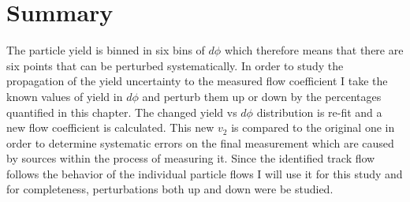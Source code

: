 \section{Summary}
The particle yield is binned in six bins of $d\phi$ which therefore means that there are six points that can be perturbed systematically. In order to study the propagation of the yield uncertainty to the measured flow coefficient I take the known values of yield in $d\phi$ and perturb them up or down by the percentages quantified in this chapter. The changed yield vs $d\phi$ distribution is re-fit and a new flow coefficient is calculated. This new $v_2$ is compared to the original one in order to determine systematic errors on the final measurement which are caused by sources within the process of measuring it. Since the identified track flow follows the behavior of the individual particle flows I will use it for this study and for completeness, perturbations both up and down were be studied. 

